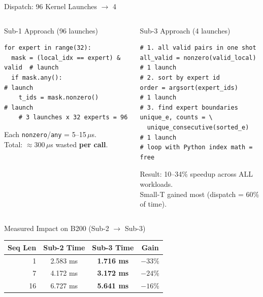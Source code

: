 \begin{frame}[fragile]{Dispatch: 96 Kernel Launches $\to$ 4}
\begin{columns}[T]
\begin{alertblock}{Sub-1 Approach (96 launches)}
\scriptsize
\begin{lstlisting}
for expert in range(32):
  mask = (local_idx == expert) & valid  # launch
  if mask.any():                         # launch
    t_ids = mask.nonzero()               # launch
    # 3 launches x 32 experts = 96
\end{lstlisting}
Each \texttt{nonzero}/\texttt{any} = 5--15\,$\mu$s.\\
Total: $\approx 300\,\mu$s wasted \textbf{per call}.
\end{alertblock}

\begin{exampleblock}{Sub-3 Approach (4 launches)}
\scriptsize
\begin{lstlisting}
# 1. all valid pairs in one shot
all_valid = nonzero(valid_local)     # 1 launch
# 2. sort by expert id
order = argsort(expert_ids)          # 1 launch
# 3. find expert boundaries
unique_e, counts = \
  unique_consecutive(sorted_e)       # 1 launch
# loop with Python index math = free
\end{lstlisting}
Result: 10--34\% speedup across ALL workloads.\\
Small-T gained most (dispatch = 60\% of time).
\end{exampleblock}
\end{columns}

\medskip
\begin{block}{Measured Impact on B200 (Sub-2 $\to$ Sub-3)}
\centering\small
\begin{tabular}{rccc}
\toprule
Seq Len & Sub-2 Time & Sub-3 Time & Gain \\
\midrule
1  & 2.583 ms & \textbf{1.716 ms} & $-33\%$ \\
7  & 4.172 ms & \textbf{3.172 ms} & $-24\%$ \\
16 & 6.727 ms & \textbf{5.641 ms} & $-16\%$ \\
\bottomrule
\end{tabular}
\end{block}
\end{frame}


